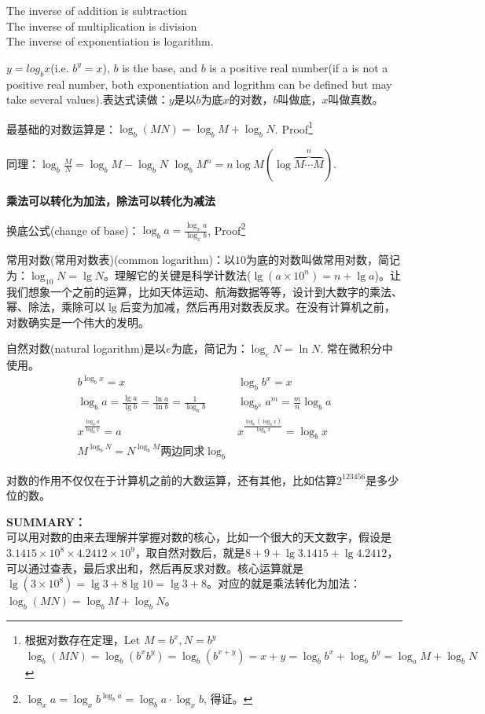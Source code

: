 \documentclass[../main.tex]{subfiles}
\begin{document}
The inverse of addition is subtraction\\
The inverse of multiplication is division\\
The inverse of exponentiation is logarithm.

$y=log_bx$(i.e. $b^y=x$), $b$ is the base, and $b$ is a positive real number(if a is not a positive real number, both exponentiation and logrithm can be defined but may take several values).表达式读做：$y$是以$b$为底$x$的对数，$b$叫做底，$x$叫做真数。

最基础的对数运算是：$\log_b(MN)=\log_bM + \log_bN$.
Proof\footnote{根据对数存在定理，Let $M=b^x, N=b^y$\\
$\log_b(MN)=\log_b(b^xb^y)=\log_b(b^{x+y})=x+y=\log_b b^x+\log_b b^y=\log_aM + \log_bN$}

同理：$\log_b \frac{M}{N} =\log_bM - \log_bN$ \;\;\;\;\;\; $\log_bM^n =n\log M(\log \overbrace{M\cdots M}^n)$.

\textbf{乘法可以转化为加法，除法可以转化为减法}

换底公式(change of base)：$\log_ba=\frac{\log_{x}a}{\log_{x}b}$, Proof\footnote{$\log_x a= \log_x b^{\log_b a} =\log _b a \cdot \log_x b$, 得证。}

常用对数(常用对数表)(common logarithm)：以$10$为底的对数叫做常用对数，简记为：$\log_{10}N = \lg N$。理解它的关键是科学计数法($\lg(a\times 10^n)=n+\lg a$)。让我们想象一个之前的运算，比如天体运动、航海数据等等，设计到大数字的乘法、幂、除法，乘除可以$\lg$后变为加减，然后再用对数表反求。在没有计算机之前，对数确实是一个伟大的发明。

自然对数(natural logarithm)是以$e$为底，简记为：$\log_eN=\ln N$. 常在微积分中使用。
\[
  \begin{array}{ll}
    b^{\log_b x}=x  &\log_b b^x = x \\
    \log_b a = \frac{\lg a}{\lg b} = \frac{\ln a}{\ln b}  = \frac{1}{\log_{a}b} & \log_{b^n}a^m=\frac{m}{n}\log_ba\\
    x^{\frac{\log_b{a}}{\log_b x}}=a & x^{\frac{\log_b(\log_b x)}{\log_b x}}=\log_b x\\
    M^{\log_b N}=N^{\log_b M}\mbox{两边同求}\log_{b}&
  \end{array}
\]

对数的作用不仅仅在于计算机之前的大数运算，还有其他，比如估算$2^{123456}$是多少位的数。

\textbf{SUMMARY：}\\
可以用对数的由来去理解并掌握对数的核心，比如一个很大的天文数字，假设是$3.1415\times 10^8 \times 4.2412\times 10^9$，取自然对数后，就是$8+9+\lg 3.1415+\lg4.2412$，可以通过查表，最后求出和，然后再反求对数。核心运算就是$\lg(3\times 10^8)=\lg3+8\lg10=\lg3+8$。对应的就是乘法转化为加法：$\log_b(MN)=\log_bM+\log_bN$。
\end{document}
